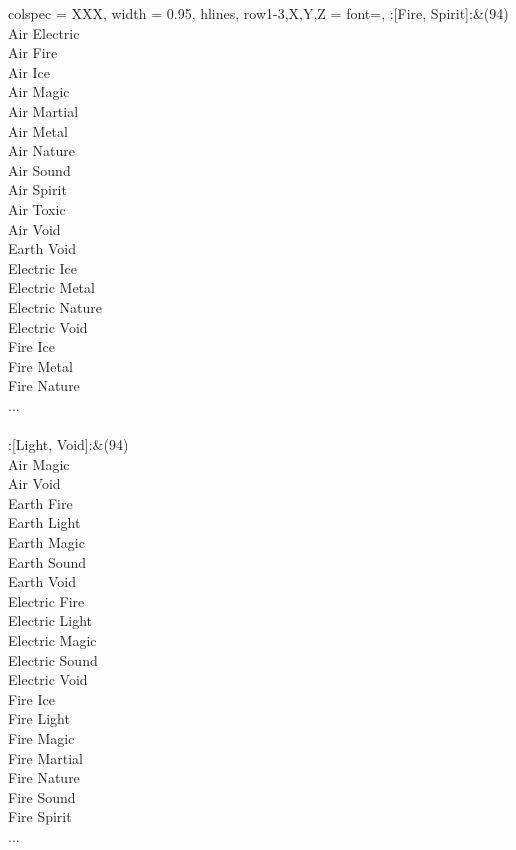 \begin{longtblr}[
	caption = {2v2 Attacking Effective},
	label = {2v2-Attacking-Effective},
]{
	colspec = {XXX}, width = 0.95\linewidth,
	hlines,
	row{1-3,X,Y,Z} = {font=\bfseries},
}
	:[Fire, Spirit]:&{(94)\\
	Air Electric \\
	Air Fire \\
	Air Ice \\
	Air Magic \\
	Air Martial \\
	Air Metal \\
	Air Nature \\
	Air Sound \\
	Air Spirit \\
	Air Toxic \\
	Air Void \\
	Earth Void \\
	Electric Ice \\
	Electric Metal \\
	Electric Nature \\
	Electric Void \\
	Fire Ice \\
	Fire Metal \\
	Fire Nature \\
	...\\
	}\\

	:[Light, Void]:&{(94)\\
	Air Magic \\
	Air Void \\
	Earth Fire \\
	Earth Light \\
	Earth Magic \\
	Earth Sound \\
	Earth Void \\
	Electric Fire \\
	Electric Light \\
	Electric Magic \\
	Electric Sound \\
	Electric Void \\
	Fire Ice \\
	Fire Light \\
	Fire Magic \\
	Fire Martial \\
	Fire Nature \\
	Fire Sound \\
	Fire Spirit \\
	...\\
	}\\


\end{longtblr}
